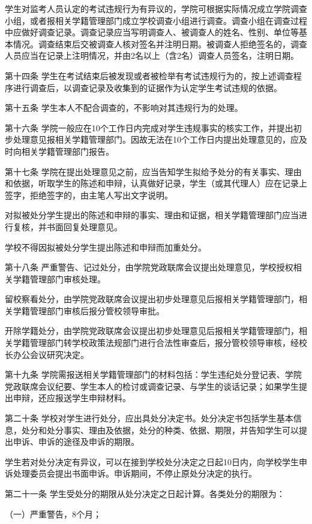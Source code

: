 \documentclass[UTF8,12pt,a4paper]{report}
\begin{document}
学生对监考人员认定的考试违规行为有异议的，学院可根据实际情况成立学院调查小组，或者报相关学籍管理部门成立学校调查小组进行调查。调查小组在调查过程中应做好调查记录。调查记录应当写明调查人、被调查人的姓名、性别、单位等基本情况。调查结束后交被调查人核对签名并注明日期。被调查人拒绝签名的，调查人员应当在记录上注明情况，并由2名以上（含2名）调查人员签名，注明日期。

第十四条  学生在考试结束后被发现或者被检举有考试违规行为的，按上述调查程序进行调查后，以调查记录及收集到的证据作为认定学生考试违规的依据。

第十五条  学生本人不配合调查的，不影响对其违规行为的处理。

第十六条  学院一般应在10个工作日内完成对学生违规事实的核实工作，并提出初步处理意见报相关学籍管理部门。因故无法在10个工作日内提出处理意见的，应及时向相关学籍管理部门报告。

第十七条  学院在提出处理意见之前，应当告知学生拟给予处分的有关事实、理由和依据，听取学生的陈述和申辩，认真做好记录，学生（或其代理人）应在记录上签字，拒绝签字的，由主笔人写出文字说明。

对拟被处分学生提出的陈述和申辩的事实、理由和证据，相关学籍管理部门应当进行复核，并书面回复处理意见。

学校不得因拟被处分学生提出陈述和申辩而加重处分。

第十八条  严重警告、记过处分，由学院党政联席会议提出处理意见，学校授权相关学籍管理部门审核处理。

留校察看处分，由学院党政联席会议提出初步处理意见后报相关学籍管理部门，相关学籍管理部门审核后报分管校领导审批。

开除学籍处分，由学院党政联席会议提出初步处理意见后报相关学籍管理部门，相关学籍管理部门转学校政策法规部门进行合法性审查后，报分管校领导审核，经校长办公会议研究决定。

第十九条  学院需报送相关学籍管理部门的材料包括：学生违纪处分登记表、学院党政联席会议纪要、学生本人的检讨或调查记录、与学生的谈话记录；如果学生提出申辩，还应报送学生申辩材料。

第二十条  学校对学生进行处分，应出具处分决定书。处分决定书包括学生基本信息，处分和处分事实、理由及依据，处分的种类、依据、期限，并告知学生可以提出申诉、申诉的途径及申诉的期限。

学生若对处分决定有异议，可以在接到学校处分决定之日起10日内，向学校学生申诉处理委员会提出书面申诉。申诉期间，不停止原处分决定的执行。

第二十一条  学生受处分的期限从处分决定之日起计算。各类处分的期限为：

（一）严重警告，8个月；
\end{document}
